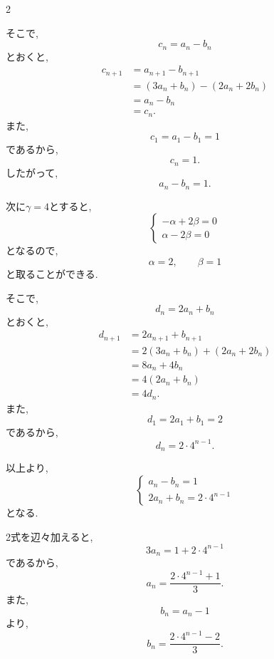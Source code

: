 \documentclass[dvipdfmx,a4paper,11pt,fleqn,openany]{jsbook}
\begin{document}
\begin{multicols*}{2}
\begin{enumerate}[label=(\arabic*),parsep=3pt]
            そこで,
            \[
              c_n=a_n-b_n
            \]
            とおくと,
            \begin{align*}
              c_{n+1}
                &=a_{n+1}-b_{n+1}\\
                &=(3a_n+b_n)-(2a_n+2b_n)\\
                &=a_n-b_n\\
                &=c_n.
            \end{align*}
            また,
            \[
              c_1=a_1-b_1=1
            \]
            であるから,
            \[
              c_n=1.
            \]
            したがって,
            \[
              a_n-b_n=1.
            \]

            次に$\gamma=4$とすると,
            \[
            \begin{cases}
              -\alpha+2\beta=0\\
              \alpha-2\beta=0
            \end{cases}
            \]
            となるので,
            \[
              \alpha=2,\qquad\beta=1
            \]
            と取ることができる.

            そこで,
            \[
              d_n=2a_n+b_n
            \]
            とおくと,
            \begin{align*}
              d_{n+1}
                &=2a_{n+1}+b_{n+1}\\
                &=2(3a_n+b_n)+(2a_n+2b_n)\\
                &=8a_n+4b_n\\
                &=4(2a_n+b_n)\\
                &=4d_n.
            \end{align*}
            また,
            \[
              d_1=2a_1+b_1=2
            \]
            であるから,
            \[
              d_n=2\cdot4^{n-1}.
            \]

            以上より,
            \[
            \begin{cases}
              a_n-b_n=1\\
              2a_n+b_n=2\cdot4^{n-1}
            \end{cases}
            \]
            となる.

            2式を辺々加えると,
            \[
              3a_n=1+2\cdot4^{n-1}
            \]
            であるから,
            \[
              a_n=\frac{2\cdot4^{n-1}+1}{3}.
            \]
            また,
            \[
              b_n=a_n-1
            \]
            より,
            \[
              b_n=\frac{2\cdot4^{n-1}-2}{3}.
            \]
      \end{enumerate}

  \end{multicols*}
\end{document}
